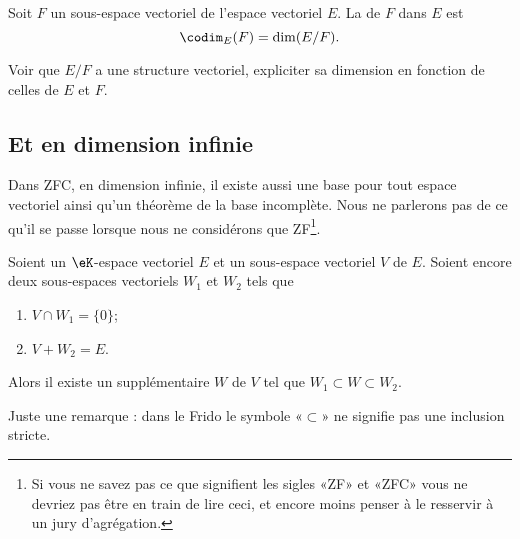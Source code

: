 \begin{definition}\label{DefCodimension}
Soit \( F\) un sous-espace vectoriel de l'espace vectoriel \( E\). La  de \( F\) dans \( E\) est
\begin{equation}
    \codim_E(F)=\dim(E/F).
\end{equation}
\end{definition}

\begin{probleme}
Voir que $E/F$ a une structure vectoriel, expliciter sa dimension en fonction de celles de $E$ et $F$.
\end{probleme}

\subsection{Et en dimension infinie}

Dans ZFC, en dimension infinie, il existe aussi une base pour tout espace vectoriel ainsi qu'un théorème de la base incomplète. Nous ne parlerons pas de ce qu'il se passe lorsque nous ne considérons que ZF\footnote{Si vous ne savez pas ce que signifient les sigles «ZF» et «ZFC» vous ne devriez pas être en train de lire ceci, et encore moins penser à le resservir à un jury d'agrégation.}.

\begin{lemma}        \label{LEMooSSRXooIyfgNz}
    Soient un \( \eK\)-espace vectoriel \( E\) et un sous-espace vectoriel \( V\) de \( E\). Soient encore deux sous-espaces vectoriels \( W_1\) et \( W_2\) tels que
    \begin{enumerate}
        \item
            \( V\cap W_1=\{ 0 \}\);
        \item
            \( V+W_2=E\).
    \end{enumerate}
    Alors il existe un supplémentaire \( W\) de \( V\) tel que \( W_1\subset W\subset W_2\).
\end{lemma}

Juste une remarque : dans le Frido le symbole «\( \subset\)» ne signifie pas une inclusion stricte.


